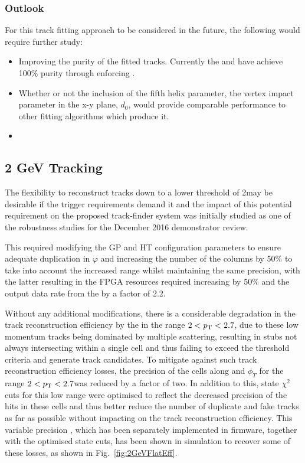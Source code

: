 \subsubsection{Outlook}\label{subsubsec:chi2outlook}
For this track fitting approach to be considered in the future, the following would require further study:
\begin{itemize}
\item Improving the purity of the fitted tracks. Currently the \KF and \LR have achieve 100\% purity through enforcing 
.
\item Whether or not the inclusion of the fifth helix parameter, the vertex impact parameter in the x-y plane, $d_{0}$, would provide comparable performance to other fitting algorithms which produce it.
\item 
\end{itemize}

\subsection{2 GeV Tracking}\label{subsec:Tmtt2GeV}
The flexibility to reconstruct tracks down to a lower \pT threshold of 2\GeV may be desirable if the trigger requirements demand it and the impact of this potential requirement on the proposed track-finder system was initially studied as one of the robustness studies for the December 2016 demonstrator review.

This required modifying the GP and HT configuration parameters to ensure adequate duplication in $\varphi$ and increasing the number of the \qpt columns by 50\% to take into account the increased \pt range whilst maintaining the same precision, with the latter resulting in the FPGA resources required increasing by 50\% and the output data rate from the \HT by a factor of 2.2.

Without any additional modifications, there is a considerable degradation in the track reconstruction efficiency by the \HT in the range $2 < p_{\mathrm{T}} < 2.7$\GeVc, due to these low momentum tracks being dominated by multiple scattering, resulting in stubs not always intersecting within a single \HT cell and thus failing to exceed the threshold criteria and generate track candidates.
To mitigate against such track reconstruction efficiency losses, the precision of the \HT cells along \qpt and $\phi_{T}$ for the range $2 < p_{\mathrm{T}} < 2.7$\GeVc was reduced by a factor of two.
In addition to this, \KF state $\chi^2$ cuts for this low \pT range were optimised to reflect the decreased precision of the hits in these \HT cells and thus better reduce the number of duplicate and fake tracks as far as possible without impacting on the \HT track reconstruction efficiency.
This variable precision \HT, which has been separately implemented in firmware, together with the optimised \KF state cuts, has been shown in simulation to recover some of these losses, as shown in Fig.~\ref{fig:2GeVFlatEff}.

